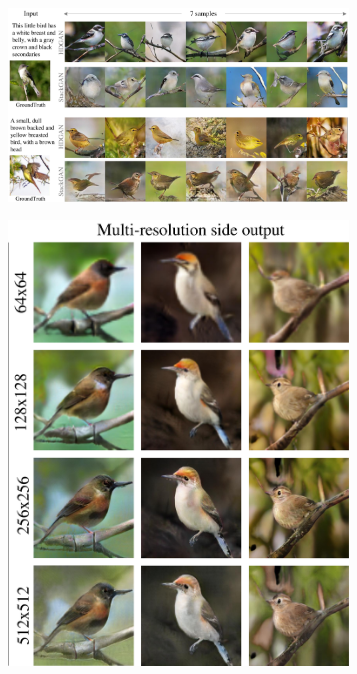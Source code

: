 \documentclass[10pt,twocolumn,letterpaper]{article}
\begin{document}
\begin{figure}[t]
    \centering
    \begin{subfigure}[t]{0.69\textwidth}
        \includegraphics[width=0.99\textwidth]{figure/multisample_cub.pdf}
    \end{subfigure} 
    \begin{subfigure}[t]{0.3\textwidth}
        \includegraphics[width=0.99\textwidth]{figure/cub_multires.pdf}

\end{subfigure}
\end{figure}
\end{document}
